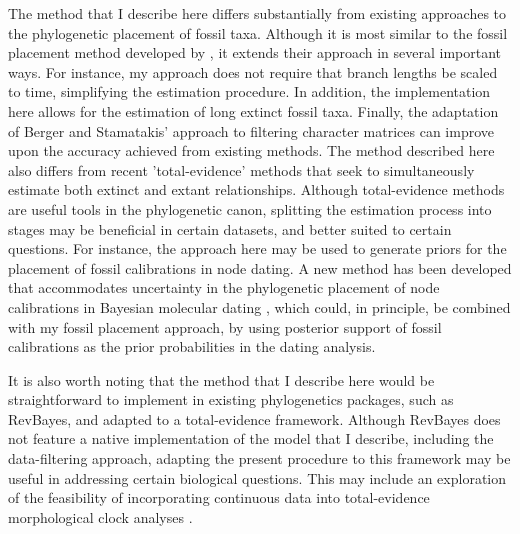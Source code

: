 \documentclass[12pt]{article}
\begin{document}
The method that I describe here differs substantially from existing approaches to the phylogenetic placement of fossil taxa. Although it is most similar to the fossil placement method developed by \cite{revell2015placing}, it extends their approach in several important ways. For instance, my approach does not require that branch lengths be scaled to time, simplifying the estimation procedure. In addition, the implementation here allows for the estimation of long extinct fossil taxa. Finally, the adaptation of Berger and Stamatakis' approach to filtering character matrices can improve upon the accuracy achieved from existing methods. The method described here also differs from recent 'total-evidence' methods that seek to simultaneously estimate both extinct and extant relationships. Although total-evidence methods are useful tools in the phylogenetic canon, splitting the estimation process into stages may be beneficial in certain datasets, and better suited to certain questions. For instance, the approach here may be used to generate priors for the placement of fossil calibrations in node dating. A new method has been developed that accommodates uncertainty in the  phylogenetic placement of node calibrations in Bayesian molecular dating \citep{guindon2018accounting}, which could, in principle, be combined with my fossil placement approach, by using posterior support of fossil calibrations as the prior probabilities in the dating analysis. 

It is also worth noting that the method that I describe here would be straightforward to
implement in existing phylogenetics packages, such as RevBayes, and adapted to a total-evidence
framework. Although RevBayes does not feature a native implementation of the model that I describe, including the 
data-filtering approach,  adapting the present procedure to this framework may be
useful in addressing certain biological questions. This may include an exploration of the feasibility of incorporating continuous
data into total-evidence morphological clock analyses \citep{zhang2015total} .
\end{document}
